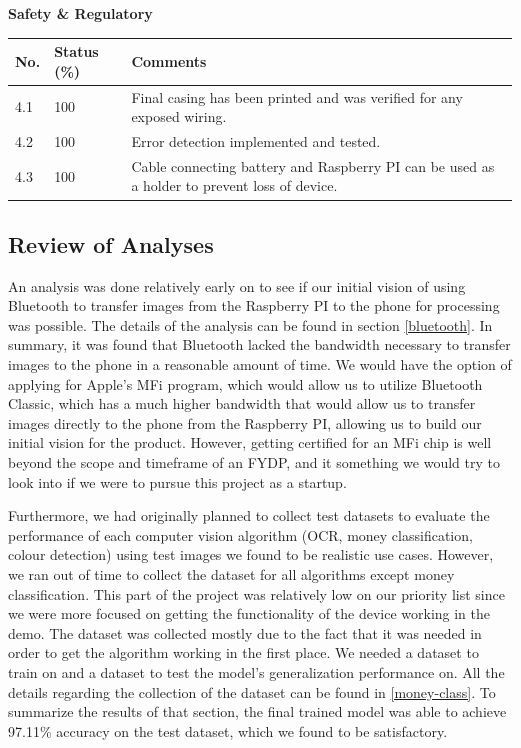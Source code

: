 \documentclass[a4paper,11pt]{article}
\begin{document}
\textbf{Safety \& Regulatory}
\begin{table}[ht]
    \centering
    \begin{tabular}{|p{0.7cm}|p{1cm}|p{12cm}|}
        \hline
        No. & Status (\%) & Comments \\ \hline
        
        4.1 & 100 & Final casing has been printed and was verified for any exposed wiring. \\ \hline
        
        4.2 & 100 & Error detection implemented and tested. \\ \hline
        
        4.3 & 100 & Cable connecting battery and Raspberry PI can be used as a holder to prevent loss of device. \\ \hline

    \end{tabular}
\end{table}

\subsection{Review of Analyses}

An analysis was done relatively early on to see if our initial vision of using Bluetooth to transfer images from the Raspberry PI to the phone for processing was possible. The details of the analysis can be found in section \ref{bluetooth}. In summary, it was found that Bluetooth lacked the bandwidth necessary to transfer images to the phone in a reasonable amount of time. We would have the option of applying for Apple's MFi program, which would allow us to utilize Bluetooth Classic, which has a much higher bandwidth that would allow us to transfer images directly to the phone from the Raspberry PI, allowing us to build our initial vision for the product. However, getting certified for an MFi chip is well beyond the scope and timeframe of an FYDP, and it something we would try to look into if we were to pursue this project as a startup.

Furthermore, we had originally planned to collect test datasets to evaluate the performance of each computer vision
algorithm (OCR, money classification, colour detection) using test images we found to be realistic use
cases. However, we ran out of time to collect the dataset for all algorithms except money classification.
This part of the project was relatively low on our priority list since we were more focused on getting
the functionality of the device working in the demo. The dataset was collected mostly due to the fact
that it was needed in order to get the algorithm working in the first place. We needed a dataset to
train on and a dataset to test the model’s generalization performance on. All the details regarding
the collection of the dataset can be found in \ref{money-class}. To summarize the results of that section, the final trained model was able to
achieve 97.11\% accuracy on the test dataset, which we found to be satisfactory.
\end{document}
